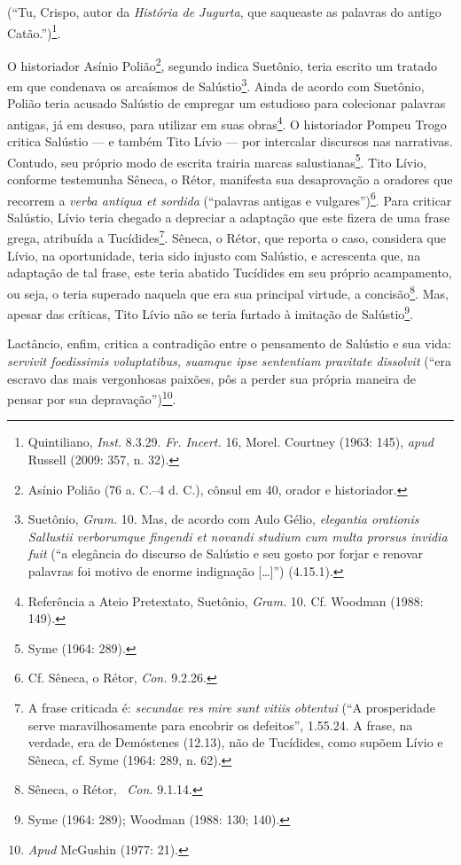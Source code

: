 (“Tu, Crispo,
autor da \emph{História de Jugurta}, que saqueaste as palavras do antigo
Catão.”)\footnote{Quintiliano, \emph{Inst.} 8.3.29. \emph{Fr. Incert.} 16, Morel. Courtney
(1963: 145), \emph{apud } Russell (2009: 357, n. 32).}.

O historiador Asínio Polião\footnote{Asínio Polião (76 a. C.--4 d. C.), cônsul
em 40, orador e historiador.}, segundo indica Suetônio, teria escrito um
tratado em que condenava os arcaísmos de Salústio\footnote{Suetônio, \emph{Gram.} 10. Mas, de acordo com Aulo Gélio,  \emph{elegantia orationis
Sallustii verborumque fingendi et novandi studium cum multa prorsus invidia
fuit} (“a elegância do discurso de Salústio e seu gosto por forjar e renovar
palavras foi motivo de enorme indignação [\ldots{}]”) (4.15.1).}. Ainda de acordo com Suetônio, Polião teria acusado Salústio de empregar
um estudioso para colecionar palavras antigas, já em desuso, para utilizar em
suas obras\footnote{ Referência a Ateio Pretextato, Suetônio, \emph{Gram.} 10. Cf. Woodman (1988: 149).}.  O historiador Pompeu Trogo critica Salústio ---
e também Tito Lívio --- por intercalar discursos nas narrativas. Contudo, seu
próprio modo de escrita trairia marcas salustianas\footnote{Syme (1964: 289).}. Tito Lívio, conforme testemunha Sêneca, o Rétor, manifesta sua
desaprovação a oradores que recorrem a \emph{verba antiqua et sordida}
(``palavras antigas e vulgares'')\footnote{ Cf. Sêneca, o Rétor, \emph{Con.}
9.2.26.}. Para criticar Salústio, Lívio teria chegado a depreciar a adaptação
que este fizera de uma frase grega, atribuída a Tucídides\footnote{A frase
criticada é: \emph{secundae res mire sunt vitiis obtentui} (“A prosperidade
serve maravilhosamente para encobrir os defeitos”, 1.55.24.
A frase, na verdade, era de Demóstenes  (12.13), não de Tucídides, como supõem
Lívio e Sêneca, cf. Syme (1964: 289, n. 62).}.  Sêneca, o Rétor, que reporta
o caso, considera que Lívio, na oportunidade, teria sido injusto com Salústio,
e acrescenta que, na adaptação de tal frase, este teria abatido Tucídides em
seu próprio acampamento, ou seja, o teria superado naquela que era sua
principal virtude, a concisão\footnote{Sêneca, o Rétor,  \emph{Con.} 9.1.14.}. Mas, apesar das críticas, Tito Lívio não se teria furtado à imitação de
Salústio\footnote{Syme (1964: 289); Woodman (1988: 130; 140).}. 

Lactâncio, enfim, critica a contradição entre o pensamento de Salústio e sua vida: \emph{servivit foedissimis voluptatibus, suamque ipse sententiam pravitate dissolvit} (``era escravo das mais vergonhosas paixões, pôs a perder sua própria maneira de pensar por sua depravação'')\footnote{\emph{Apud} McGushin (1977: 21).}.

